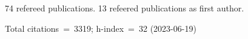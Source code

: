 74 refereed publications. 13 refeered publications as first author.

Total citations~=~3319; h-index~=~32 (2023-06-19)